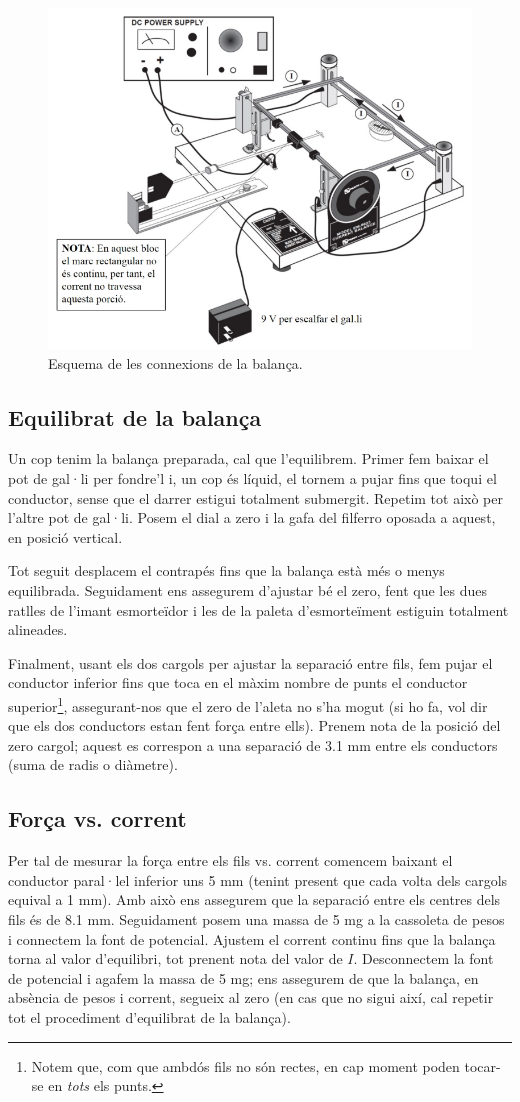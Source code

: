 \documentclass[a4paper,10.5pt]{report}
\begin{document}
\begin{figure}[h]
	\centering
	\includegraphics[width=0.6\linewidth]{screenshot009}
	\caption{Esquema de les connexions de la balança.}
	\label{fig:2.2}
\end{figure}

\subsection{Equilibrat de la balança}
Un cop tenim la balança preparada, cal que l'equilibrem. Primer fem baixar el pot de gal·li per fondre'l i, un cop és líquid, el tornem a pujar fins que toqui el conductor, sense que el darrer estigui totalment submergit. Repetim tot això per l'altre pot de gal·li. Posem el dial a zero i la gafa del filferro oposada a aquest, en posició vertical.

Tot seguit desplacem el contrapés fins que la balança està més o menys equilibrada. Seguidament ens assegurem d'ajustar bé el zero, fent que les dues ratlles de l'imant esmorteïdor i les de la paleta d'esmorteïment estiguin totalment alineades.

Finalment, usant els dos cargols per ajustar la separació entre fils, fem pujar el conductor inferior fins que toca en el màxim nombre de punts el conductor superior\footnote{Notem que, com que ambdós fils no són rectes, en cap moment poden tocar-se en \textit{tots} els punts.}, assegurant-nos que el zero de l'aleta no s'ha mogut (si ho fa, vol dir que els dos conductors estan fent força entre ells). Prenem nota de la posició del zero cargol; aquest es correspon a una separació de 3.1 mm entre els conductors (suma de radis o diàmetre).

\subsection{Força vs. corrent}
Per tal de mesurar la força entre els fils vs. corrent comencem baixant el conductor paral·lel inferior uns 5 mm (tenint present que cada volta dels cargols equival a 1 mm). Amb això ens assegurem que la separació entre els centres dels fils és de 8.1 mm. Seguidament posem una massa de 5 mg a la cassoleta de pesos i connectem la font de potencial. Ajustem el corrent continu fins que la balança torna al valor d'equilibri, tot prenent nota del valor de $I$. Desconnectem la font de potencial i agafem la massa de 5 mg; ens assegurem de que la balança, en absència de pesos i corrent, segueix al zero (en cas que no sigui així, cal repetir tot el procediment d'equilibrat de la balança).
\end{document}
